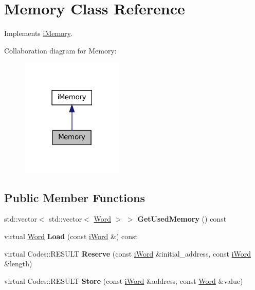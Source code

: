 \hypertarget{classMemory}{
\section{Memory Class Reference}
\label{classMemory}
}


Implements \hyperlink{classiMemory}{iMemory}.  




Collaboration diagram for Memory:\nopagebreak
\begin{figure}[H]
\begin{center}
\leavevmode
\includegraphics[width=138pt]{classMemory__coll__graph}
\end{center}
\end{figure}
\subsection*{Public Member Functions}
\begin{DoxyCompactItemize}
\item 
\hypertarget{classMemory_a98671c2e4238df99efd56cb26185a17c}{
std::vector$<$ std::vector$<$ \hyperlink{classWord}{Word} $>$ $>$ {\bfseries GetUsedMemory} () const }
\label{classMemory_a98671c2e4238df99efd56cb26185a17c}

\item 
\hypertarget{classMemory_aca021609915080b38ca1b00d9b416e80}{
virtual \hyperlink{classWord}{Word} {\bfseries Load} (const \hyperlink{classiWord}{iWord} \&) const }
\label{classMemory_aca021609915080b38ca1b00d9b416e80}

\item 
\hypertarget{classMemory_a80cd994d4833dde66b8005184e510dda}{
virtual Codes::RESULT {\bfseries Reserve} (const \hyperlink{classiWord}{iWord} \&initial\_\-address, const \hyperlink{classiWord}{iWord} \&length)}
\label{classMemory_a80cd994d4833dde66b8005184e510dda}

\item 
\hypertarget{classMemory_a23703464fb24710d09be1b2010e79edc}{
virtual Codes::RESULT {\bfseries Store} (const \hyperlink{classiWord}{iWord} \&address, const \hyperlink{classWord}{Word} \&value)}
\label{classMemory_a23703464fb24710d09be1b2010e79edc}

\end{DoxyCompactItemize}
